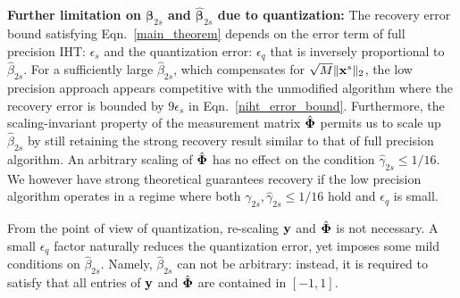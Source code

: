 \documentclass{article}
\begin{document}

{\bf Further limitation on ${\boldsymbol{\beta}}_{2s}$ and $\hat{\boldsymbol{\beta}}_{2s}$ due to quantization:} The recovery error bound satisfying Eqn.~\ref{main_theorem} depends on the error term of full precision IHT: $ {\epsilon_s}$ and the quantization error: $ {\epsilon}_q$ that is inversely proportional to $\hat{\beta}_{2s}$. For a sufficiently large $\hat{\beta}_{2s}$, which compensates for $\sqrt{M} \|{\bf x}^s \|_2$, the low precision approach appears competitive with the unmodified algorithm where the recovery error is bounded by $9\epsilon_s$ in Eqn.~\ref{niht_error_bound}. Furthermore, the scaling-invariant property of the measurement matrix $\hat{\bf \Phi}$ permits us to scale up $\hat{\beta}_{2s}$ by still retaining the strong recovery result similar to that of full precision algorithm. An arbitrary scaling of $\hat{\bf \Phi}$ has no effect on the condition $\hat{\gamma}_{2s}\leq 1/16$. We however have strong theoretical guarantees recovery if the low precision algorithm operates in a regime where both ${\gamma}_{2s}, \hat{\gamma}_{2s}\leq 1/16$ hold and ${\epsilon}_q$ is small.

From the  point of view of quantization, re-scaling ${\bf y}$ and $\hat{\bf \Phi}$ is not necessary. A small   ${\epsilon}_q$ factor naturally reduces the quantization error, yet imposes some mild conditions on $\hat{\beta}_{2s}$. Namely, $\hat{\beta}_{2s}$ can not be arbitrary: instead, it is required to satisfy that all entries of ${\bf y}$ and $\hat{\bf \Phi}$ are contained in $[-1, 1]$.
\end{document}
